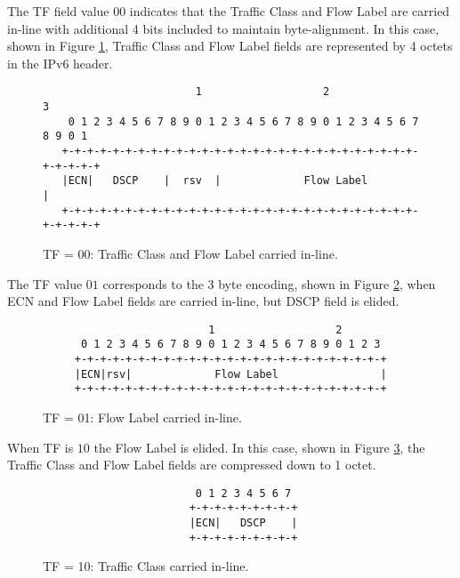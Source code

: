 \documentclass[12pt, titlepage, a4paper]{report}
\newenvironment{mylisting}
{\begin{list}{}{\setlength{\leftmargin}{1em}}\item\footnotesize}
{\end{list}}
\begin{document}
The TF field value $00$ indicates that the Traffic Class and Flow Label are carried in-line with additional 4 bits included to maintain byte-alignment. In this case, shown in Figure \ref{fig:tf.00}, Traffic Class and  Flow Label fields are represented by 4 octets in the IPv6 header.
\begin{figure}[htp]
\begin{mylisting}
\begin{verbatim}
                        1                   2                   3
    0 1 2 3 4 5 6 7 8 9 0 1 2 3 4 5 6 7 8 9 0 1 2 3 4 5 6 7 8 9 0 1
   +-+-+-+-+-+-+-+-+-+-+-+-+-+-+-+-+-+-+-+-+-+-+-+-+-+-+-+-+-+-+-+-+
   |ECN|   DSCP    |  rsv  |             Flow Label                |
   +-+-+-+-+-+-+-+-+-+-+-+-+-+-+-+-+-+-+-+-+-+-+-+-+-+-+-+-+-+-+-+-+
\end{verbatim}
\end{mylisting}
\caption{ TF = 00: Traffic Class and Flow Label carried in-line.}\label{fig:tf.00}
\end{figure}

The TF value $01$ corresponds to the 3 byte encoding, shown in Figure \ref{fig:tf.01}, when ECN and Flow Label fields are carried in-line, but DSCP field is elided.

\begin{figure}[htp]
\begin{mylisting}
\begin{verbatim}
                          1                   2
      0 1 2 3 4 5 6 7 8 9 0 1 2 3 4 5 6 7 8 9 0 1 2 3
     +-+-+-+-+-+-+-+-+-+-+-+-+-+-+-+-+-+-+-+-+-+-+-+-+
     |ECN|rsv|             Flow Label                |
     +-+-+-+-+-+-+-+-+-+-+-+-+-+-+-+-+-+-+-+-+-+-+-+-+
\end{verbatim}
\end{mylisting}
\caption{TF = 01: Flow Label carried in-line.}\label{fig:tf.01}
\end{figure}

When TF is $10$ the Flow Label is elided. In this case, shown in Figure \ref{fig:tf.10}, the Traffic Class and Flow Label fields are compressed down to 1 octet.

\begin{figure}[htp]
\begin{mylisting}
\begin{verbatim}
                        0 1 2 3 4 5 6 7
                       +-+-+-+-+-+-+-+-+
                       |ECN|   DSCP    |
                       +-+-+-+-+-+-+-+-+
\end{verbatim}
\end{mylisting}
\caption{TF = 10: Traffic Class carried in-line.}\label{fig:tf.10}
\end{figure}
\end{document}
